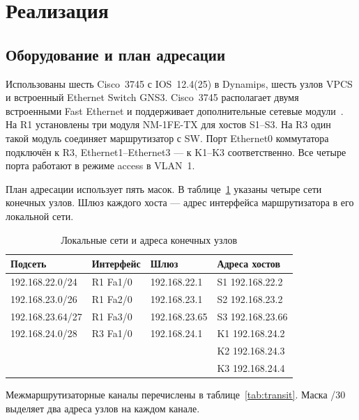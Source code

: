 \documentclass[a4paper,14pt]{extarticle}
\begin{document}
\clearpage
\section{Реализация}

\subsection{Оборудование и план адресации}

Использованы шесть Cisco~3745 с IOS~12.4(25) в Dynamips, шесть узлов
VPCS и встроенный Ethernet Switch GNS3. Cisco~3745 располагает двумя
встроенными Fast Ethernet и поддерживает дополнительные сетевые
модули~\cite{gns3-ios}. На R1 установлены три модуля NM-1FE-TX для хостов
S1--S3. На R3 один такой модуль соединяет маршрутизатор с SW. Порт
Ethernet0 коммутатора подключён к R3, Ethernet1--Ethernet3 --- к K1--K3
соответственно. Все четыре порта работают в режиме access в VLAN~1.

План адресации использует пять масок. В таблице~\ref{tab:lan} указаны
четыре сети конечных узлов. Шлюз каждого хоста --- адрес интерфейса
маршрутизатора в его локальной сети.

\begin{table}[htbp]
  \centering\small
  \caption{Локальные сети и адреса конечных узлов}
  \label{tab:lan}
  \begin{tabularx}{\linewidth}{@{}llXX@{}}
    \toprule
    Подсеть & Интерфейс & Шлюз & Адреса хостов \\
    \midrule
    192.168.22.0/24  & R1 Fa1/0 & 192.168.22.1  & S1 192.168.22.2 \\
    192.168.23.0/26  & R1 Fa2/0 & 192.168.23.1  & S2 192.168.23.2 \\
    192.168.23.64/27 & R1 Fa3/0 & 192.168.23.65 & S3 192.168.23.66 \\
    192.168.24.0/28  & R3 Fa1/0 & 192.168.24.1  & K1 192.168.24.2 \\
                     &          &               & K2 192.168.24.3 \\
                     &          &               & K3 192.168.24.4 \\
    \bottomrule
  \end{tabularx}
\end{table}

Межмаршрутизаторные каналы перечислены в таблице~\ref{tab:transit}.
Маска /30 выделяет два адреса узлов на каждом канале.
\end{document}
